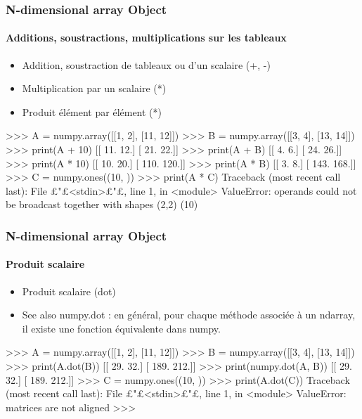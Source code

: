 \begin{frame}[fragile]
\frametitle{N-dimensional array Object}
\framesubtitle{Additions, soustractions, multiplications sur les tableaux}
\begin{itemize}
 \item Addition, soustraction de tableaux ou d'un scalaire (+, -)
 \item Multiplication par un scalaire (*)
 \item Produit élément par élément (*) 
\end{itemize}
\begin{pythonConsole}
>>> A = numpy.array([[1, 2], [11, 12]])
>>> B = numpy.array([[3, 4], [13, 14]])
>>> print(A + 10)
[[ 11.  12.]
 [ 21.  22.]]
>>> print(A + B)
[[  4.   6.]
 [ 24.  26.]]
>>> print(A * 10)
[[  10.   20.]
 [ 110.  120.]]
>>> print(A * B)
[[   3.    8.]
 [ 143.  168.]]
>>> C = numpy.ones((10, ))
>>> print(A * C)
Traceback (most recent call last):
  File £"£<stdin>£"£, line 1, in <module>
ValueError: operands could not be broadcast together with shapes (2,2) (10) 
\end{pythonConsole}
\end{frame}
\begin{frame}[fragile]
\frametitle{N-dimensional array Object}
\framesubtitle{Produit scalaire}
\begin{itemize}
 \item Produit scalaire (dot)
 \item See also numpy.dot : en général, pour chaque méthode associée à un ndarray, il existe une fonction équivalente dans numpy. 
\end{itemize}
\begin{pythonConsole}
>>> A = numpy.array([[1, 2], [11, 12]])
>>> B = numpy.array([[3, 4], [13, 14]])
>>> print(A.dot(B))
[[  29.   32.]
 [ 189.  212.]]
>>> print(numpy.dot(A, B))
[[  29.   32.]
 [ 189.  212.]]
>>> C = numpy.ones((10, ))
>>> print(A.dot(C))
Traceback (most recent call last):
  File £"£<stdin>£"£, line 1, in <module>
ValueError: matrices are not aligned
>>> 
\end{pythonConsole}
\end{frame}
